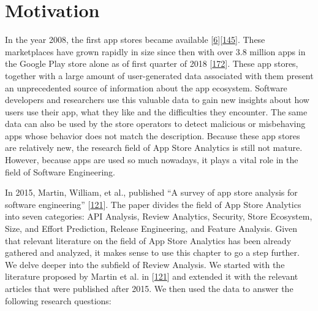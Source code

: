 \documentclass[]{book}
\begin{document}
\section{Motivation}\label{motivation-6}

In the year 2008, the first app stores became available
{[}\protect\hyperlink{ref-appStoreLaunch}{6}{]}{[}\protect\hyperlink{ref-androidMarketLaunch}{145}{]}.
These marketplaces have grown rapidly in size since then with over 3.8
million apps in the Google Play store alone as of first quarter of 2018
{[}\protect\hyperlink{ref-appNumber}{172}{]}. These app stores, together
with a large amount of user-generated data associated with them present
an unprecedented source of information about the app ecosystem. Software
developers and researchers use this valuable data to gain new insights
about how users use their app, what they like and the difficulties they
encounter. The same data can also be used by the store operators to
detect malicious or misbehaving apps whose behavior does not match the
description. Because these app stores are relatively new, the research
field of App Store Analytics is still not mature. However, because apps
are used so much nowadays, it plays a vital role in the field of
Software Engineering.

In 2015, Martin, William, et al., published ``A survey of app store
analysis for software engineering''
{[}\protect\hyperlink{ref-martin2015survey}{121}{]}. The paper divides
the field of App Store Analytics into seven categories: API Analysis,
Review Analytics, Security, Store Ecosystem, Size, and Effort
Prediction, Release Engineering, and Feature Analysis. Given that
relevant literature on the field of App Store Analytics has been already
gathered and analyzed, it makes sense to use this chapter to go a step
further. We delve deeper into the subfield of Review Analysis. We
started with the literature proposed by Martin et al. in
{[}\protect\hyperlink{ref-martin2015survey}{121}{]} and extended it with
the relevant articles that were published after 2015. We then used the
data to answer the following research questions:
\end{document}
